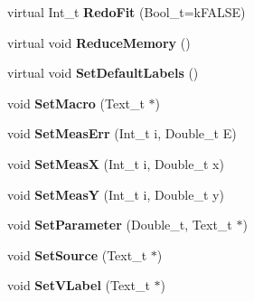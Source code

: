 \begin{DoxyCompactItemize}
\item 
\hypertarget{classTSplineFit_ade52a4777e01b3bfca21aaa47245d020}{
virtual Int\_\-t {\bfseries RedoFit} (Bool\_\-t=kFALSE)}
\label{classTSplineFit_ade52a4777e01b3bfca21aaa47245d020}

\item 
\hypertarget{classTSplineFit_a3eac6adf262a621ea7a05c5713fde3c7}{
virtual void {\bfseries ReduceMemory} ()}
\label{classTSplineFit_a3eac6adf262a621ea7a05c5713fde3c7}

\item 
\hypertarget{classTSplineFit_a7cbb94997b5067dea37ce34d34634a7f}{
virtual void {\bfseries SetDefaultLabels} ()}
\label{classTSplineFit_a7cbb94997b5067dea37ce34d34634a7f}

\item 
\hypertarget{classTSplineFit_a2ed3cf463bb807aa598e3a4576dc569e}{
void {\bfseries SetMacro} (Text\_\-t $\ast$)}
\label{classTSplineFit_a2ed3cf463bb807aa598e3a4576dc569e}

\item 
\hypertarget{classTSplineFit_a0bece7c59cc2d3d76b4f764d0d4aac8e}{
void {\bfseries SetMeasErr} (Int\_\-t i, Double\_\-t E)}
\label{classTSplineFit_a0bece7c59cc2d3d76b4f764d0d4aac8e}

\item 
\hypertarget{classTSplineFit_af9be30021edba4238f4719871bc41678}{
void {\bfseries SetMeasX} (Int\_\-t i, Double\_\-t x)}
\label{classTSplineFit_af9be30021edba4238f4719871bc41678}

\item 
\hypertarget{classTSplineFit_a2dbd5269912a1c7f57b4854a89074abe}{
void {\bfseries SetMeasY} (Int\_\-t i, Double\_\-t y)}
\label{classTSplineFit_a2dbd5269912a1c7f57b4854a89074abe}

\item 
\hypertarget{classTSplineFit_a0950d1debe4cca5ea5d4150ed65263ec}{
void {\bfseries SetParameter} (Double\_\-t, Text\_\-t $\ast$)}
\label{classTSplineFit_a0950d1debe4cca5ea5d4150ed65263ec}

\item 
\hypertarget{classTSplineFit_a6bc51fc7586bb6bb8bf03574cd5e15dc}{
void {\bfseries SetSource} (Text\_\-t $\ast$)}
\label{classTSplineFit_a6bc51fc7586bb6bb8bf03574cd5e15dc}

\item 
\hypertarget{classTSplineFit_a97cb2923e7e3acefe267638f87b42aa1}{
void {\bfseries SetVLabel} (Text\_\-t $\ast$)}
\label{classTSplineFit_a97cb2923e7e3acefe267638f87b42aa1}


\end{DoxyCompactItemize}

